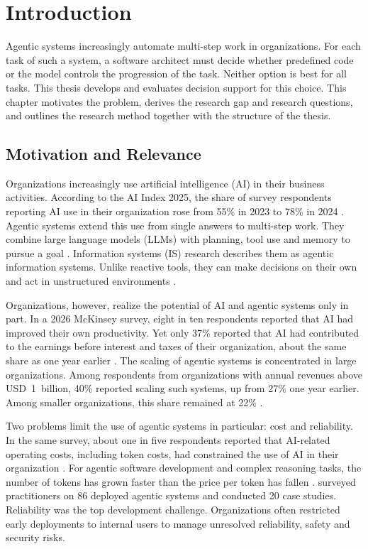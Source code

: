 \clearpage
\section{Introduction}
\label{sec:Intro}
Agentic systems increasingly automate multi-step work in organizations. For each task of such a system, a software architect must decide whether predefined code or the model controls the progression of the task. Neither option is best for all tasks. This thesis develops and evaluates decision support for this choice. This chapter motivates the problem, derives the research gap and research questions, and outlines the research method together with the structure of the thesis.

\subsection{Motivation and Relevance}
\label{subsec:intro/motivation}
Organizations increasingly use artificial intelligence (AI) in their business activities. According to the AI Index 2025, the share of survey respondents reporting AI use in their organization rose from 55\% in 2023 to 78\% in 2024 \parencite{maslejArtificialIntelligenceIndex2025}. Agentic systems extend this use from single answers to multi-step work. They combine large language models (LLMs) with planning, tool use and memory to pursue a goal \parencite{dwivediAgenticAISystems2026,sapkotaAIAgentsVs2026}. Information systems (IS) research describes them as agentic information systems. Unlike reactive tools, they can make decisions on their own and act in unstructured environments \parencite{holldackAgenticInformationSystems2026}.

Organizations, however, realize the potential of AI and agentic systems only in part. In a 2026 McKinsey survey, eight in ten respondents reported that AI had improved their own productivity. Yet only 37\% reported that AI had contributed to the earnings before interest and taxes of their organization, about the same share as one year earlier \parencite{tinkoffStateAI2026}. The scaling of agentic systems is concentrated in large organizations. Among respondents from organizations with annual revenues above USD~1~billion, 40\% reported scaling such systems, up from 27\% one year earlier. Among smaller organizations, this share remained at 22\% \parencite{tinkoffStateAI2026}.

Two problems limit the use of agentic systems in particular: cost and reliability. In the same survey, about one in five respondents reported that AI-related operating costs, including token costs, had constrained the use of AI in their organization \parencite{tinkoffStateAI2026}. For agentic software development and complex reasoning tasks, the number of tokens has grown faster than the price per token has fallen \parencite{tinkoffStateAI2026}. \textcite{panMeasuringAgentsProduction2025} surveyed practitioners on 86 deployed agentic systems and conducted 20 case studies. Reliability was the top development challenge. Organizations often restricted early deployments to internal users to manage unresolved reliability, safety and security risks.

